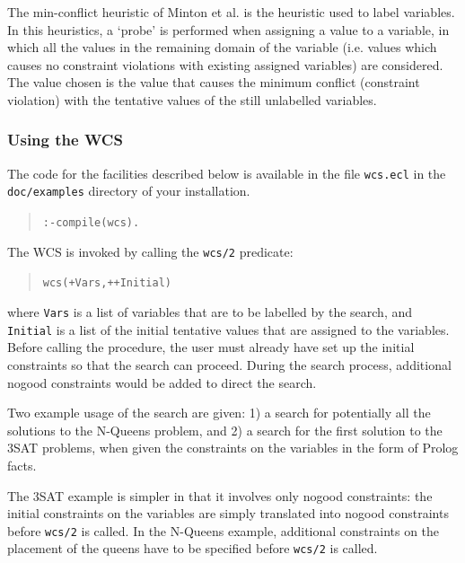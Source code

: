 The min-conflict heuristic of Minton et al. is the heuristic used to
label variables. In this heuristics, a `probe' is performed when assigning
a value to a variable, in which all the values in the remaining domain of the
variable (i.e. values which causes no constraint violations with existing
assigned variables) are considered. The value chosen is the value that
causes the minimum conflict (constraint violation) with the tentative
values of the still unlabelled variables. 

\subsubsection{Using the WCS}
The code for the facilities described below is available
in the file {\tt wcs.ecl} in the {\tt doc/examples} directory of your
{\eclipse} installation.
\begin{quote}\begin{alltt}
:- compile(wcs).
\end{alltt}\end{quote}
The WCS is invoked by calling the \verb'wcs/2' predicate:
\begin{quote}\begin{alltt}
wcs(+Vars, ++Initial)
\end{alltt}\end{quote}

\noindent
where \verb'Vars' is a list of variables that are to be labelled by the
search, and \verb'Initial' is a list of the initial tentative values that
are assigned to the variables. Before calling the procedure, the user must
already have set up the initial constraints so that the search can
proceed. During the search process, additional nogood constraints would be
added to direct the search.

Two example usage of the search are given: 1) a search for potentially all
the solutions to the N-Queens problem, and 2) a search for the first
solution to the 3SAT problems, when given the constraints on the variables
in the form of Prolog facts.

The 3SAT example is simpler in that it involves only nogood constraints:
the initial constraints on the variables are simply translated into nogood
constraints before \verb'wcs/2' is called. In the N-Queens example,
additional constraints on the placement of the queens have to be specified
before \verb'wcs/2' is called.  

